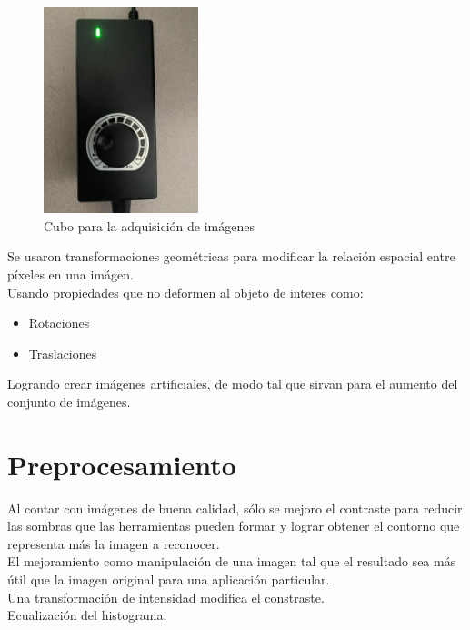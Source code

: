\documentclass[a4paper, 11pt]{article}
\begin{document}
\begin{figure}[h]
\centering
\includegraphics[width=0.4\textwidth]{dimer1}
\caption{Cubo para la adquisición de imágenes}
\label{cubo}
\end{figure}

Se usaron transformaciones geométricas para modificar la relación espacial entre píxeles en una imágen.\\

Usando propiedades que no deformen al objeto de interes como:

\begin{itemize}
\item Rotaciones
\item Traslaciones
\end{itemize}

Logrando crear imágenes artificiales, de modo tal que sirvan para el aumento del conjunto de imágenes.\\

\pagebreak
\section{Preprocesamiento}

Al contar con imágenes de buena calidad, sólo se mejoro el contraste para reducir las sombras que las herramientas pueden formar y lograr obtener el contorno que representa más la imagen a reconocer.\\

El mejoramiento como manipulación de una imagen tal que el resultado sea más útil que la imagen original para una aplicación particular.\\

Una transformación de intensidad modifica el constraste.\\

Ecualización del histograma.\\
\end{document}
